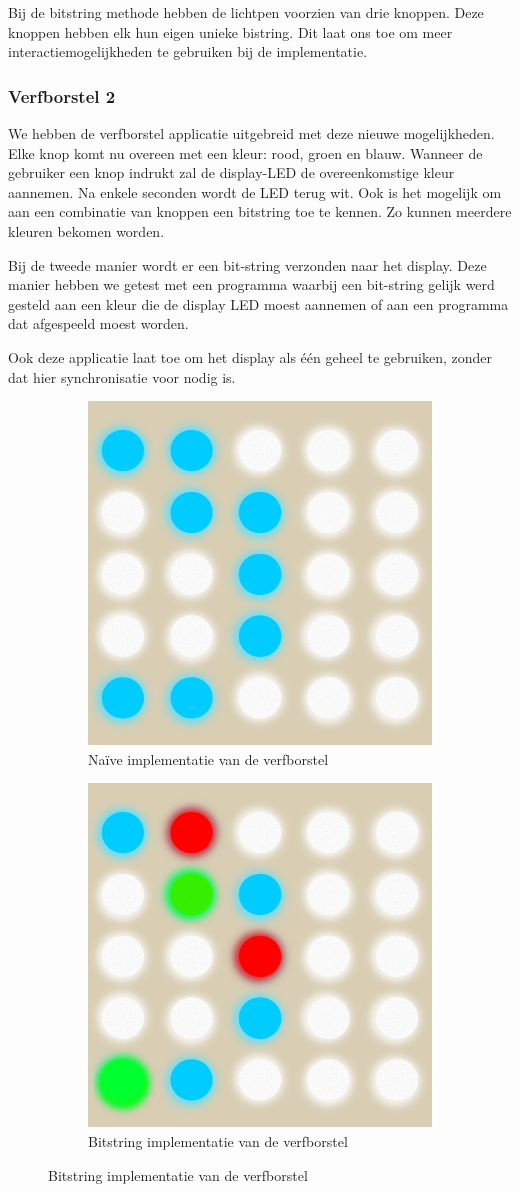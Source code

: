 \documentclass{article}
\begin{document}
Bij de bitstring methode hebben de lichtpen voorzien van drie knoppen. Deze knoppen hebben elk hun eigen unieke bistring. Dit laat ons toe om meer interactiemogelijkheden te gebruiken bij de implementatie. 

\subsubsection{Verfborstel 2}
We hebben de verfborstel applicatie uitgebreid met deze nieuwe mogelijkheden. Elke knop komt nu overeen met een kleur: rood, groen en blauw. Wanneer de gebruiker een knop indrukt zal de display-LED de overeenkomstige kleur aannemen. Na enkele seconden wordt de LED terug wit. Ook is het mogelijk om aan een combinatie van knoppen een bitstring toe te kennen. Zo kunnen meerdere kleuren bekomen worden. 

Bij de tweede manier wordt er een bit-string verzonden naar het display. Deze manier hebben we getest met een programma waarbij een bit-string gelijk werd gesteld aan een kleur die de display LED moest aannemen of aan een programma dat afgespeeld moest worden.

Ook deze applicatie laat toe om het display als \'e\'en geheel te gebruiken, zonder dat hier synchronisatie voor nodig is.

\begin{figure} [H]
  \begin{subfigure}[b]{4.2 cm}
    \includegraphics[width=4.2 cm]{Verfborstel.png}
    \caption{Na\"ive implementatie van de verfborstel}
    \label{verfNaif}
  \end{subfigure}
%
    \begin{subfigure}[b]{0.3 cm}
    \end{subfigure}
  \begin{subfigure}[b]{4.2 cm}
    \includegraphics[width=4.2 cm]{VerfborstelKleur.png}
    \caption{Bitstring implementatie van de verfborstel}
    \label{verfBit}
  \end{subfigure}
\end{figure}
\end{document}
